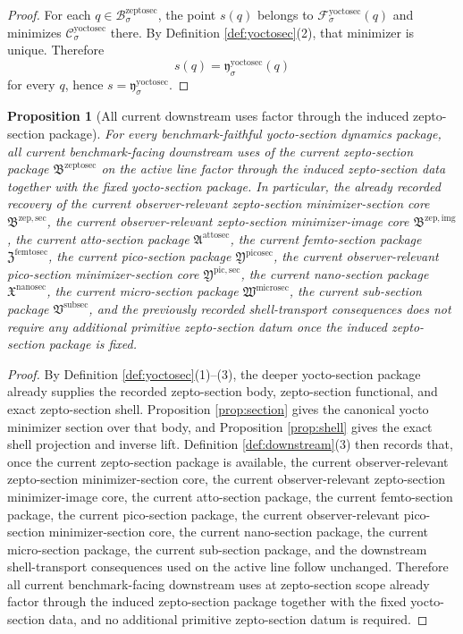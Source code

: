 \documentclass[11pt]{article}
\newcommand{\SubSectionPackage}{\mathfrak V^{\mathrm{subsec}}}
\newcommand{\MicroSectionPackage}{\mathfrak W^{\mathrm{microsec}}}
\newcommand{\NanoSectionPackage}{\mathfrak X^{\mathrm{nanosec}}}
\newcommand{\PicoSectionPackage}{\mathfrak Y^{\mathrm{picosec}}}
\newcommand{\PicoMinSectionCore}{\mathfrak Y^{\mathrm{pic,sec}}}
\newcommand{\FemtoSectionPackage}{\mathfrak Z^{\mathrm{femtosec}}}
\newcommand{\AttoSectionPackage}{\mathfrak A^{\mathrm{attosec}}}
\newcommand{\ZeptoSectionPackage}{\mathfrak B^{\mathrm{zeptosec}}}
\newcommand{\ZeptoSectionBody}[1]{\mathcal B_{#1}^{\mathrm{zeptosec}}}
\newcommand{\ZeptoImageCore}{\mathfrak B^{\mathrm{zep,img}}}
\newcommand{\ZeptoMinSectionCore}{\mathfrak B^{\mathrm{zep,sec}}}
\newcommand{\YoctoSectionFiber}[2]{\mathcal F_{#1}^{\mathrm{yoctosec}}(#2)}
\newcommand{\YoctoSectionZeptoMin}[1]{\mathfrak y_{#1}^{\mathrm{yoctosec}}}
\newcommand{\YoctoSectionFunctional}[1]{\mathscr C_{#1}^{\mathrm{yoctosec}}}
\newtheorem{proposition}{Proposition}
\begin{document}
\begin{proof}
For each \(q\in\ZeptoSectionBody{\sigma}\), the point \(s(q)\) belongs to \(\YoctoSectionFiber{\sigma}{q}\) and minimizes \(\YoctoSectionFunctional{\sigma}\) there. By Definition \ref{def:yoctosec}(2), that minimizer is unique. Therefore
\[
s(q)=\YoctoSectionZeptoMin{\sigma}(q)
\]
for every \(q\), hence \(s=\YoctoSectionZeptoMin{\sigma}\).
\end{proof}

\begin{proposition}[All current downstream uses factor through the induced zepto-section package]
\label{prop:downstream}
For every benchmark-faithful yocto-section dynamics package, all current benchmark-facing downstream uses of the current zepto-section package \(\ZeptoSectionPackage\) on the active line factor through the induced zepto-section data together with the fixed yocto-section package. In particular, the already recorded recovery of the current observer-relevant zepto-section minimizer-section core \(\ZeptoMinSectionCore\), the current observer-relevant zepto-section minimizer-image core \(\ZeptoImageCore\), the current atto-section package \(\AttoSectionPackage\), the current femto-section package \(\FemtoSectionPackage\), the current pico-section package \(\PicoSectionPackage\), the current observer-relevant pico-section minimizer-section core \(\PicoMinSectionCore\), the current nano-section package \(\NanoSectionPackage\), the current micro-section package \(\MicroSectionPackage\), the current sub-section package \(\SubSectionPackage\), and the previously recorded shell-transport consequences does not require any additional primitive zepto-section datum once the induced zepto-section package is fixed.
\end{proposition}

\begin{proof}
By Definition \ref{def:yoctosec}(1)--(3), the deeper yocto-section package already supplies the recorded zepto-section body, zepto-section functional, and exact zepto-section shell. Proposition \ref{prop:section} gives the canonical yocto minimizer section over that body, and Proposition \ref{prop:shell} gives the exact shell projection and inverse lift. Definition \ref{def:downstream}(3) then records that, once the current zepto-section package is available, the current observer-relevant zepto-section minimizer-section core, the current observer-relevant zepto-section minimizer-image core, the current atto-section package, the current femto-section package, the current pico-section package, the current observer-relevant pico-section minimizer-section core, the current nano-section package, the current micro-section package, the current sub-section package, and the downstream shell-transport consequences used on the active line follow unchanged. Therefore all current benchmark-facing downstream uses at zepto-section scope already factor through the induced zepto-section package together with the fixed yocto-section data, and no additional primitive zepto-section datum is required.
\end{proof}
\end{document}
